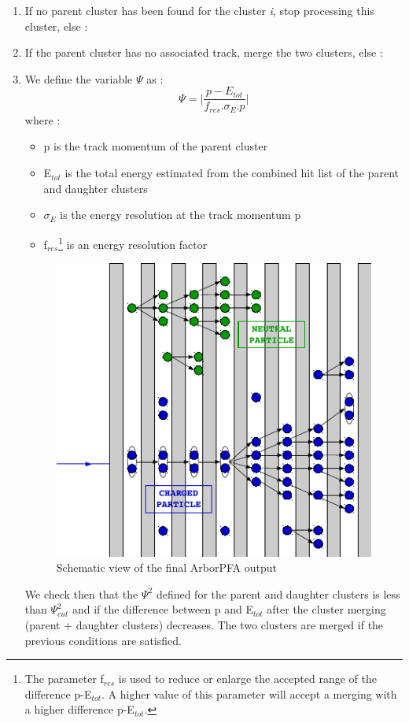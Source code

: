 \documentclass[cits]{JINST}
\begin{document}
\begin{enumerate}
  \item If no parent cluster has been found for the cluster \textit{i}, stop processing this cluster, else :
  \item If the parent cluster has no associated track, merge the two clusters, else :
  \item We define the variable $\Psi$ as :
  \begin{equation}
    \label{PSI2_ALGORITHM_EQUATION}
    \Psi = \Big| \frac{p-E_{tot}}{f_{res} . \sigma_E . p} \Big|
  \end{equation}
  where :
  \begin{itemize}
    \item p is the track momentum of the parent cluster
    \item E$_{tot}$ is the total energy estimated from the combined hit list of the parent and daughter clusters
    \item $\sigma_E$ is the energy resolution at the track momentum p 
    \item f$_{res}$\footnote{The parameter f$_{res}$ is used to reduce or enlarge the accepted range of the difference p-E$_{tot}$. A higher value of this parameter will accept a merging with a higher difference p-E$_{tot}$.} is an energy resolution factor
  \end{itemize}
  
\begin{figure}[!h]
  \begin{center}
    \includegraphics[width=0.4\linewidth]{PfoCreation.pdf}
  \end{center}
  \caption{\label{ARBOR_PFO_CREATION} Schematic view of the final ArborPFA output}
\end{figure}

We check then that the $\Psi^2$ defined for the parent and daughter clusters is less than $\Psi^2_{cut}$ and if the difference between p and E$_{tot}$ after the cluster merging (parent + daughter clusters) decreases. The two clusters are merged if the previous conditions are satisfied.

\end{enumerate}
\end{document}
